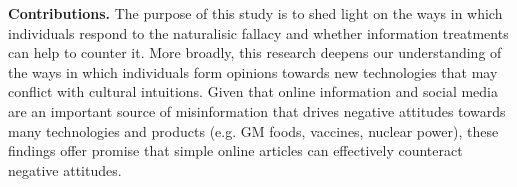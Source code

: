 \documentclass[12pt]{article}
\newcommand{\todo}[1]{\textit{\textcolor{red}{$<$todo$>$ #1 $<$/todo$>$}}}
\begin{document}



\textbf{Contributions.} The purpose of this study is to shed light on the ways in which individuals respond to the naturalisic fallacy and whether information treatments can help to counter it. More broadly, this research deepens our understanding of the ways in which individuals form opinions towards new technologies that may conflict with cultural intuitions. Given that online information and social media are an important source of misinformation that drives negative attitudes towards many technologies and products (e.g. GM foods, vaccines, nuclear power), these findings offer promise that simple online articles can effectively counteract negative attitudes.





\end{document}
